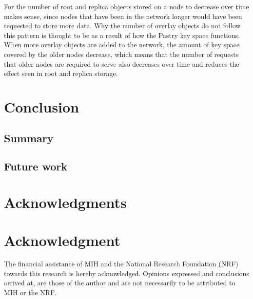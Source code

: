 \documentclass[10pt,a4paper,conference]{IEEEtran}
\begin{document}
For the number of root and replica objects stored on a node to decrease over time makes sense, since nodes that have been in the network longer would
have been requested to store more data. Why the number of overlay objects do not follow this pattern is thought to be as a result of how the Pastry
key space functions. When more overlay objects are added to the network, the amount of key space covered by the older nodes decrease, which means
that the number of requests that older nodes are required to serve also decreases over time and reduces the effect seen in root and replica storage.

\section{Conclusion}
\label{conclusion}

\subsection{Summary}

\subsection{Future work}


\ifCLASSOPTIONcompsoc
  \section*{Acknowledgments}
\else
  \section*{Acknowledgment}
\fi

The financial assistance of MIH and the National Research Foundation (NRF) towards this research is hereby acknowledged. Opinions expressed and
conclusions arrived at, are those of the author and are not necessarily to be attributed to MIH or the NRF.




\end{document}
